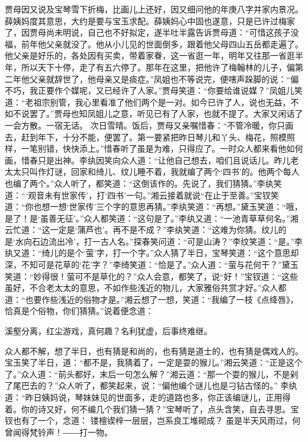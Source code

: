 \documentclass[12pt,oneside]{book}
\begin{document}
贾母因又说及宝琴雪下折梅，比画儿上还好，因又细问他的年庚八字并家内景况。薛姨妈度其意思，大约是要与宝玉求配。薛姨妈心中固也遂意，只是已许过梅家了，因贾母尚未明说，自己也不好拟定，遂半吐半露告诉贾母道：“可惜这孩子没福，前年他父亲就没了。他从小儿见的世面倒多，跟着他父母四山五岳都走遍了。他父亲是好乐的，各处因有买卖，带着家眷，这一省逛一年，明年又往那一省逛半年，所以天下十停，走了有五六停了。那年在这里，把他许了梅翰林的儿子，偏第二年他父亲就辞世了，他母亲又是痰症。”凤姐也不等说完，便嗐声跺脚的说：“偏不巧，我正要作个媒呢，又已经许了人家。”贾母笑道：“你要给谁说媒？”凤姐儿笑道：“老祖宗别管，我心里看准了他们两个是一对。如今已许了人，说也无益，不如不说罢了。”贾母也知凤姐儿之意，听见已有了人家，也就不提了。大家又闲话了一会方散。一宿无话。
次日雪晴。饭后，贾母又亲嘱惜春：“不管冷暖，你只画去，赶到年下，十分不能，便罢了。第一要紧把昨日琴儿和丫头、梅花，照模照样，一笔别错，快快添上。”惜春听了虽是为难，只得应了。一时众人都来看他如何画，惜春只是出神。李纨因笑向众人道：“让他自己想去，咱们且说话儿。昨儿老太太只叫作灯谜，回家和绮儿、纹儿睡不着，我就编了两个‘四书’的。他两个每人也编了两个。”众人听了，都笑道：“这倒该作的。先说了，我们猜猜。”李纨笑道：“‘观音未有世家传’，打‘四书’一句。”湘云接着就说“在止于至善。”宝钗笑道：“你也想一想‘世家传’三个字的意思再猜。”李纨笑道：“再想。”黛玉笑道：“哦，是了！是‘虽善无征’。”众人都笑道：“这句是了。”李纨又道：“一池青草草何名。”湘云忙道：“这一定是‘蒲芦也’。再不是不成？”李纨笑道：“这难为你猜。纹儿的是‘水向石边流出冷’，打一古人名。”探春笑问道：“可是山涛？”李纹笑道：“是。”李纨又道：“绮儿的是个‘萤’字，打一个字。”众人猜了半日，宝琴笑道：“这个意思却深，不知可是花草的‘花’字？”李绮笑道：“恰是了。”众人道：“萤与花何干？”黛玉笑道：“妙得很！萤可不是草化的？”众人会意，都笑了，说“好！”宝钗道：“这些虽好，不合老太太的意思，不如作些浅近的物儿，大家雅俗共赏才好。”众人都道：“也要作些浅近的俗物才是。”湘云想了一想，笑道：“我编了一枝《点绛唇》，恰真是个俗物，你们猜猜。”说着便念道：

溪壑分离，红尘游戏，真何趣？名利犹虚，后事终难继。

众人都不解，想了半日，也有猜是和尚的，也有猜是道士的，也有猜是偶戏人的。宝玉笑了半日，道：“都不是，我猜着了，一定是耍的猴儿。”湘云笑道：“正是这个了。”众人道：“前头都好，末后一句怎么解？”湘云道：“那一个耍的猴儿，不是剁了尾巴去的？”众人听了，都笑起来，说：“偏他编个谜儿也是刁钻古怪的。”
李纨道：“昨日姨妈说，琴妹妹见的世面多，走的道路也多，你正该编谜儿，正用得着。你的诗又好，何不编几个我们猜一猜？”宝琴听了，点头含笑，自去寻思。宝钗也有了一个，念道：
镂檀锲梓一层层，岂系良工堆砌成？
虽是半天风雨过，何曾闻得梵铃声！――打一物。
\end{document}
